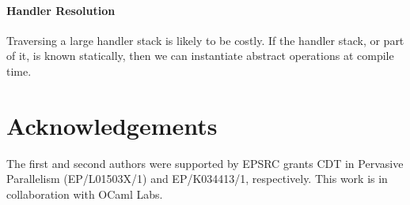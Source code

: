 \documentclass[preprint,numbers]{sigplanconf}
\begin{document}
\paragraph{Handler Resolution}
Traversing a large handler stack is likely to be costly. If the
handler stack, or part of it, is known statically, then we can
instantiate abstract operations at compile time.



\section{Acknowledgements}
The first and second authors were supported by EPSRC grants CDT in
Pervasive Parallelism (EP/L01503X/1) and EP/K034413/1,
respectively. This work is in collaboration with OCaml Labs.

 \softraggedright

\end{document}
